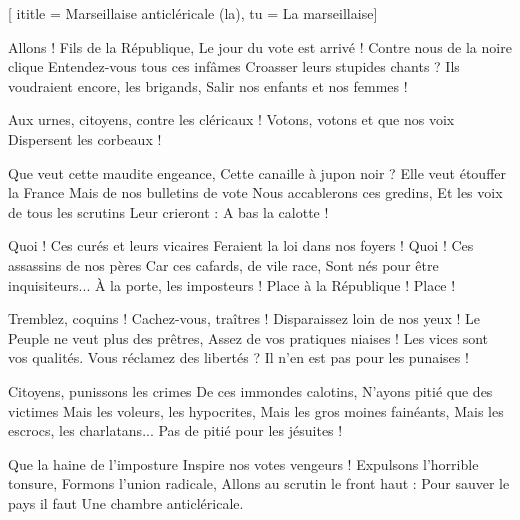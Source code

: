  [
ititle = {Marseillaise anticléricale (la)},
tu = {La marseillaise}]


\beginverse
Allons ! Fils de la République,
Le jour du vote est arrivé !
Contre nous de la noire clique
Entendez-vous tous ces infâmes
Croasser leurs stupides chants ?
Ils voudraient encore, les brigands,
Salir nos enfants et nos femmes !
\endverse

\beginchorus
Aux urnes, citoyens, contre les cléricaux !
Votons, votons et que nos voix
Dispersent les corbeaux !
\endchorus

\beginverse
Que veut cette maudite engeance,
Cette canaille à jupon noir ?
Elle veut étouffer la France
Mais de nos bulletins de vote
Nous accablerons ces gredins,
Et les voix de tous les scrutins
Leur crieront : A bas la calotte !
\endverse

\beginverse
Quoi ! Ces curés et leurs vicaires
Feraient la loi dans nos foyers !
Quoi ! Ces assassins de nos pères
Car ces cafards, de vile race,
Sont nés pour être inquisiteurs...
À la porte, les imposteurs !
Place à la République ! Place !
\endverse

\beginverse
Tremblez, coquins ! Cachez-vous, traîtres !
Disparaissez loin de nos yeux !
Le Peuple ne veut plus des prêtres,
Assez de vos pratiques niaises !
Les vices sont vos qualités.
Vous réclamez des libertés ?
Il n'en est pas pour les punaises !
\endverse

\beginverse
Citoyens, punissons les crimes
De ces immondes calotins,
N'ayons pitié que des victimes
Mais les voleurs, les hypocrites,
Mais les gros moines fainéants,
Mais les escrocs, les charlatans...
Pas de pitié pour les jésuites !
\endverse

\beginverse
Que la haine de l'imposture
Inspire nos votes vengeurs !
Expulsons l'horrible tonsure,
Formons l'union radicale,
Allons au scrutin le front haut :
Pour sauver le pays il faut
Une chambre anticléricale.
\endverse

\endsong